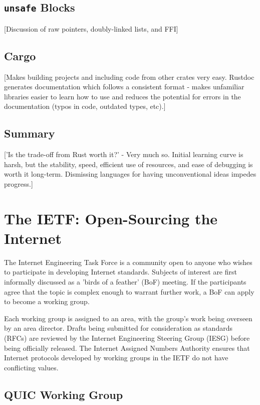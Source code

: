 \documentclass{l4proj}
\begin{document}
\section{\texttt{unsafe} Blocks}
[Discussion of raw pointers, doubly-linked lists, and FFI]

\section{Cargo}
[Makes building projects and including code from other crates very easy. Rustdoc generates documentation which follows a consistent format - makes unfamiliar libraries easier to learn how to use and reduces the potential for errors in the documentation (typos in code, outdated types, etc).]

\section{Summary}
['Is the trade-off from Rust worth it?' - Very much so. Initial learning curve is harsh, but the stability, speed, efficient use of resources, and ease of debugging is worth it long-term. Dismissing languages for having unconventional ideas impedes progress.]


\pagebreak


\chapter{The IETF: Open-Sourcing the Internet}

The Internet Engineering Task Force is a community open to anyone who wishes to participate in developing Internet standards. Subjects of interest are first informally discussed as a 'birds of a feather' (BoF) meeting. If the participants agree that the topic is complex enough to warrant further work, a BoF can apply to become a working group.

Each working group is assigned to an area, with the group's work being overseen by an area director. Drafts being submitted for consideration as standards (RFCs) are reviewed by the Internet Engineering Steering Group (IESG) before being officially released. The Internet Assigned Numbers Authority ensures that Internet protocols developed by working groups in the IETF do not have conflicting values.

\section{QUIC Working Group}
\end{document}
